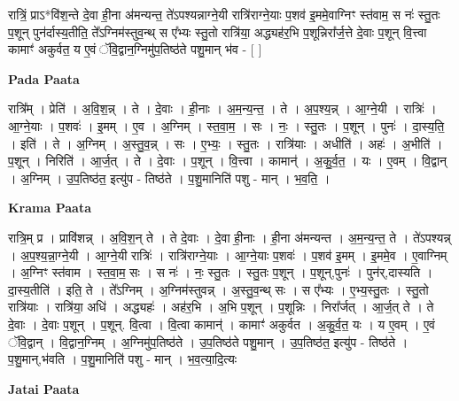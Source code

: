 \documentclass[17pt]{extarticle}
\begin{document}
रात्रिं॒ प्राऽ*वि॑श॒न्ते दे॒वा ही॒ना अ॑मन्यन्त॒ ते॑ऽपश्यन्नाग्ने॒यी रात्रि॑राग्ने॒याः प॒शव॑ इ॒ममे॒वाग्निꣳ स्त॑वाम॒ स नः॑ स्तु॒तः प॒शून् पुन॑र्दास्य॒तीति॒ ते᳚ऽग्निम॑स्तुव॒न्थ् स ए᳚भ्यः स्तु॒तो रात्रि॑या॒ अद्ध्यह॑र॒भि प॒शून्निरा᳚र्ज॒त्ते दे॒वाः प॒शून् वि॒त्त्वा कामाꣳ॑ अकुर्वत॒ य ए॒वं ॅवि॒द्वान॒ग्निमु॑प॒तिष्ठ॑ते पशु॒मान् भ॑व - [ ] \newline

\textbf{Pada Paata} \newline

रात्रि᳚म् । प्रेति॑ । अ॒वि॒श॒न्न् । ते । दे॒वाः । ही॒नाः । अ॒म॒न्य॒न्त॒ । ते । अ॒प॒श्य॒न्न् । आ॒ग्ने॒यी । रात्रिः॑ । आ॒ग्ने॒याः । प॒शवः॑ । इ॒मम् । ए॒व । अ॒ग्निम् । स्त॒वा॒म॒ । सः । नः॒ । स्तु॒तः । प॒शून् । पुनः॑ । दा॒स्य॒ति॒ । इति॑ । ते । अ॒ग्निम् । अ॒स्तु॒व॒न्न् । सः । ए॒भ्यः॒ । स्तु॒तः । रात्रि॑याः । अधीति॑ । अहः॑ । अ॒भीति॑ । प॒शून् । निरिति॑ । आ॒र्ज॒त् । ते । दे॒वाः । प॒शून् । वि॒त्त्वा । कामान्॑ । अ॒कु॒र्व॒त॒ । यः । ए॒वम् । वि॒द्वान् । अ॒ग्निम् । उ॒प॒तिष्ठ॑त॒ इत्यु॑प - तिष्ठ॑ते । प॒शु॒मानिति॑ पशु - मान् । भ॒व॒ति॒ ।  \newline


\textbf{Krama Paata} \newline

रात्रि॒म् प्र । प्रावि॑शन्न् । अ॒वि॒श॒न् ते । ते दे॒वाः । दे॒वा ही॒नाः । ही॒ना अ॑मन्यन्त । अ॒म॒न्य॒न्त॒ ते । ते॑ऽपश्यन्न् । अ॒प॒श्य॒न्ना॒ग्ने॒यी । आ॒ग्ने॒यी रात्रिः॑ । रात्रि॑राग्ने॒याः । आ॒ग्ने॒याः प॒शवः॑ । प॒शव॑ इ॒मम् । इ॒ममे॒व । ए॒वाग्निम् । अ॒ग्निꣳ स्त॑वाम । स्त॒वा॒म॒ सः । स नः॑ । नः॒ स्तु॒तः । स्तु॒तः प॒शून् । प॒शून्,पुनः॑ । पुन॑र्,दास्यति । दा॒स्य॒तीति॑ । इति॒ ते । ते᳚ऽग्निम् । अ॒ग्निम॑स्तुवन्न् । अ॒स्तु॒व॒न्थ् सः । स ए᳚भ्यः । ए॒भ्य॒स्तु॒तः । स्तु॒तो रात्रि॑याः । रात्रि॑या॒ अधि॑ । अद्ध्यहः॑ । अह॑र॒भि । अ॒भि प॒शून् । प॒शून्निः । निरा᳚र्जत् । आ॒र्ज॒त् ते । ते दे॒वाः । दे॒वाः प॒शून् । प॒शून्. वि॒त्वा । वि॒त्वा कामान्॑ । कामाꣳ॑ अकुर्वत । अ॒कु॒र्व॒त॒ यः । य ए॒वम् । ए॒वं ॅवि॒द्वान् । वि॒द्वान॒ग्निम् । अ॒ग्निमु॑प॒तिष्ठ॑ते । उ॒प॒तिष्ठ॑ते पशु॒मान् । उ॒प॒तिष्ठ॑त॒ इत्यु॑प - तिष्ठ॑ते । प॒शु॒मान्,भ॑वति । प॒शु॒मानिति॑ पशु - मान् । भ॒व॒त्या॒दि॒त्यः \newline

\textbf{Jatai Paata} \newline
\end{document}
